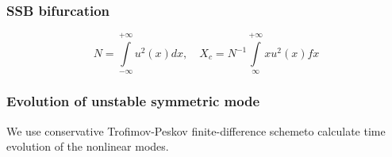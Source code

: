 \documentclass{beamer}
\begin{document}
\begin{frame}
\frametitle{SSB bifurcation}

$$N = \int \limits_{-\infty}^{+\infty} u^2(x) dx, \quad X_c = N^{-1} \int \limits_{\infty}^{+\infty} x u^2(x) fx$$

\begin{figure}
\label{pic:pitchfork}
\end{figure}

\end{frame}


\begin{frame}
\frametitle{Evolution of unstable symmetric mode}
We use conservative Trofimov-Peskov finite-difference scheme\footnotemark[7] to calculate time evolution of the nonlinear modes.
\begin{figure}
\label{pic:evolution}

\end{figure}

\end{frame}
\end{document}
